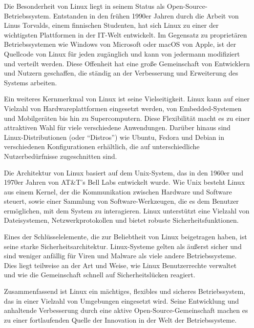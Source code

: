 Die Besonderheit von Linux liegt in seinem Status als
Open-Source-Betriebssystem. Entstanden in den frühen 1990er Jahren durch die
Arbeit von Linus Torvalds, einem finnischen Studenten, hat sich Linux zu einer
der wichtigsten Plattformen in der IT-Welt entwickelt. Im Gegensatz zu
proprietären Betriebssystemen wie Windows von Microsoft oder macOS von Apple,
ist der Quellcode von Linux für jeden zugänglich und kann von jedermann
modifiziert und verteilt werden. Diese Offenheit hat eine große Gemeinschaft von
Entwicklern und Nutzern geschaffen, die ständig an der Verbesserung und
Erweiterung des Systems arbeiten.

Ein weiteres Kernmerkmal von Linux ist seine Vielseitigkeit. Linux kann auf
einer Vielzahl von Hardwareplattformen eingesetzt werden, von Embedded-Systemen
und Mobilgeräten bis hin zu Supercomputern. Diese Flexibilität macht es zu einer
attraktiven Wahl für viele verschiedene Anwendungen. Darüber hinaus sind
Linux-Distributionen (oder ``Distros'') wie Ubuntu, Fedora und Debian in
verschiedenen Konfigurationen erhältlich, die auf unterschiedliche
Nutzerbedürfnisse zugeschnitten sind.

Die Architektur von Linux basiert auf dem Unix-System, das in den 1960er und
1970er Jahren von AT\&T's Bell Labs entwickelt wurde. Wie Unix besteht Linux aus
einem Kernel, der die Kommunikation zwischen Hardware und Software steuert,
sowie einer Sammlung von Software-Werkzeugen, die es dem Benutzer ermöglichen,
mit dem System zu interagieren. Linux unterstützt eine Vielzahl von
Dateisystemen, Netzwerkprotokollen und bietet robuste Sicherheitsfunktionen.

Eines der Schlüsselelemente, die zur Beliebtheit von Linux beigetragen haben,
ist seine starke Sicherheitsarchitektur. Linux-Systeme gelten als äußerst sicher
und sind weniger anfällig für Viren und Malware als viele andere Betriebssysteme.
Dies liegt teilweise an der Art und Weise, wie Linux Benutzerrechte verwaltet
und wie die Gemeinschaft schnell auf Sicherheitslücken reagiert.

Zusammenfassend ist Linux ein mächtiges, flexibles und sicheres Betriebssystem,
das in einer Vielzahl von Umgebungen eingesetzt wird. Seine Entwicklung und
anhaltende Verbesserung durch eine aktive Open-Source-Gemeinschaft machen es zu
einer fortlaufenden Quelle der Innovation in der Welt der Betriebssysteme.